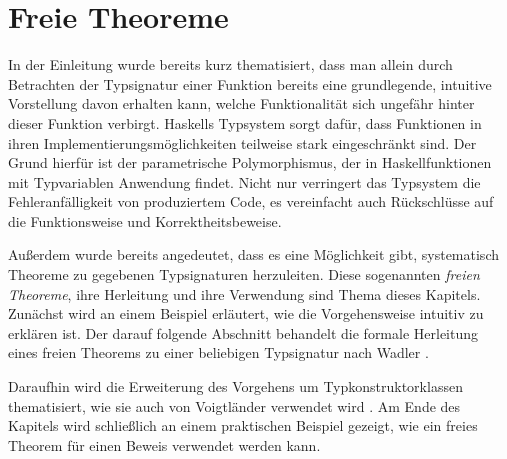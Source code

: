 \section{Freie Theoreme}

\label{sec:freie-theoreme}

In der Einleitung wurde bereits kurz thematisiert, dass man allein durch Betrachten der Typsignatur einer Funktion bereits
eine grundlegende, intuitive Vorstellung davon erhalten kann, welche Funktionalität sich ungefähr hinter dieser Funktion
verbirgt. Haskells Typsystem sorgt dafür, dass Funktionen in ihren Implementierungsmöglichkeiten
teilweise stark eingeschränkt sind. Der Grund hierfür ist der parametrische Polymorphismus, der in Haskellfunktionen
mit Typvariablen Anwendung findet. Nicht nur verringert das Typsystem die Fehleranfälligkeit von produziertem
Code, es vereinfacht auch Rückschlüsse auf die Funktionsweise und Korrektheitsbeweise.

Außerdem wurde bereits angedeutet, dass es eine Möglichkeit gibt, systematisch Theoreme zu gegebenen Typsignaturen
herzuleiten. Diese sogenannten \textit{freien Theoreme}, ihre Herleitung und ihre Verwendung sind Thema dieses Kapitels.
Zunächst wird an einem Beispiel
erläutert, wie die Vorgehensweise intuitiv zu erklären ist. Der darauf folgende Abschnitt behandelt die formale Herleitung
eines freien Theorems zu einer beliebigen Typsignatur nach Wadler \cite{wadler}.

Daraufhin wird die Erweiterung des Vorgehens um Typkonstruktorklassen thematisiert, wie sie
auch von Voigtländer verwendet wird \cite{voigtlander}. Am Ende des Kapitels wird schließlich an einem
praktischen Beispiel gezeigt, wie ein freies Theorem für einen Beweis verwendet werden kann.




